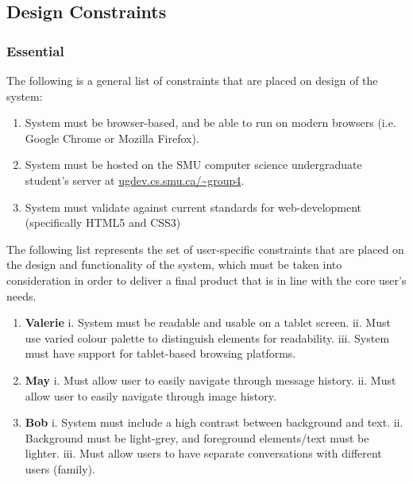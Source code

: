 \documentclass[11pt]{article}
\begin{document}
\subsection{Design Constraints}
\subsubsection{Essential}
The following is a general list of constraints that are placed on design of the system:
\begin{enumerate}
    \item System must be browser-based, and be able to run on modern browsers (i.e. Google Chrome or
        Mozilla Firefox).
    \item System must be hosted on the SMU computer science undergraduate student's server at
        \url{ugdev.cs.smu.ca/~group4}.
    \item System must validate against current standards for web-development (specifically HTML5 and
        CSS3)
\end{enumerate}

The following list represents the set of user-specific constraints that are placed on the design and
functionality of the system, which must be taken into consideration in order to deliver a final
product that is in line with the core user's needs.
\begin{enumerate}[label=\alph*.]
    \item \textbf{Valerie}
        \subitem i. System must be readable and usable on a tablet screen.
        \subitem ii. Must use varied colour palette to distinguish elements for readability.
        \subitem iii. System must have support for tablet-based browsing platforms.
    \item \textbf{May}
        \subitem i. Must allow user to easily navigate through message history.
        \subitem ii. Must allow user to easily navigate through image history.
    \item \textbf{Bob}
        \subitem i. System must include a high contrast between background and text.
        \subitem ii. Background must be light-grey, and foreground elements/text must be lighter.
        \subitem iii. Must allow users to have separate conversations with different users (family).
\end{enumerate}
\end{document}
